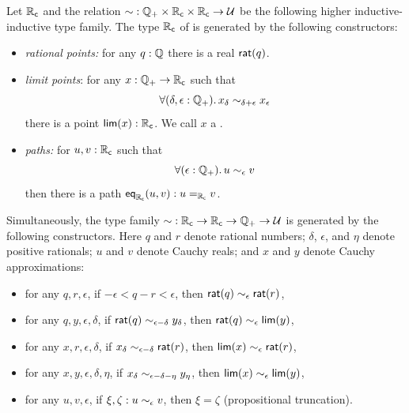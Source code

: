 \begin{defn}\label{defn:cauchy-reals}
  Let $\RC$ and the relation $\closesym:\Qp \times \RC \times \RC \to \type$ be the following higher inductive-inductive type family.
  The type $\RC$ of 
  is generated by the following constructors:
  \begin{itemize}
  \item \emph{rational points:}
    for any $q : \Q$ there is a real $\rcrat(q)$.
  \item \emph{limit points}:
    for any $x : \Qp \to \RC$ such that
    \begin{equation}
      \label{eq:RC-cauchy}
      \fall{\delta, \epsilon : \Qp} x_\delta \close{\delta + \epsilon} x_\epsilon
    \end{equation}
    there is a point $\rclim(x) : \RC$. We call $x$ a .
  \item \emph{paths:}
    for $u, v : \RC$ such that
    \begin{equation}
      \label{eq:RC-path}
      \fall{\epsilon : \Qp} u \close\epsilon v
    \end{equation}
    then there is a path $\rceq(u, v) : \id[\RC]{u}{v}$.
  \end{itemize}
  Simultaneously, the type family $\closesym:\RC\to\RC\to\Qp \to\type$ is generated by the following constructors.
  Here $q$ and $r$ denote rational numbers; $\delta$, $\epsilon$, and $\eta$ denote positive rationals; $u$ and $v$ denote Cauchy reals; and $x$ and $y$ denote Cauchy approximations:
  \begin{itemize}
  \item for any $q,r,\epsilon$, if $-\epsilon < q - r < \epsilon$, then $\rcrat(q) \close\epsilon \rcrat(r)$,
  \item for any $q,y,\epsilon,\delta$, if $\rcrat(q) \close{\epsilon - \delta} y_\delta$, then $\rcrat(q) \close{\epsilon} \rclim(y)$,
  \item for any $x,r,\epsilon,\delta$, if $x_\delta \close{\epsilon - \delta} \rcrat(r)$, then $\rclim(x) \close\epsilon \rcrat(r)$,
  \item for any $x,y,\epsilon,\delta,\eta$, if $x_\delta \close{\epsilon - \delta - \eta} y_\eta$, then $\rclim(x) \close\epsilon \rclim(y)$,
  \item for any $u,v,\epsilon$, if $\xi,\zeta : u \close{\epsilon} v$, then $\xi=\zeta$ (propositional truncation).
  \end{itemize}
\end{defn}


